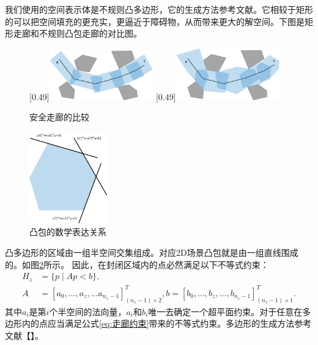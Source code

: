 \documentclass[master,academic]{ysuthesis} %
\begin{document}
		我们使用的空间表示体是不规则凸多边形，它的生成方法参考文献\cite{SikangLiu:2017}。它相较于矩形的可以把空间填充的更充实，更逼近于障碍物，从而带来更大的解空间。下图是矩形走廊和不规则凸包走廊的对比图。
		\begin{figure}[!ht]
			\centering
			[0.49\textwidth]{\includegraphics[width=0.4\textwidth]{安全走廊比较矩形1.png}}
			[0.49\textwidth]{\includegraphics[width=0.4\textwidth]{安全走廊比较多边形2.png}}
			\caption{安全走廊的比较}
			\label{安全走廊比较}
		\end{figure}
		\begin{figure}[!ht]
			\centering
			\includegraphics[width=0.3\textwidth]{凸包矩阵.png}
			\caption{凸包的数学表达关系}
			\label{fig:凸包矩阵}
		\end{figure}
		
		凸多边形的区域由一组半空间交集组成。对应2D场景凸包就是由一组直线围成的。如图\ref{fig:凸包矩阵}所示。
		因此，在封闭区域内的点必然满足以下不等式约束：
		\begin{equation}
			\begin{aligned}
				H_z&=\{p\mid Ap<b\},\\
				A&=\left[ a_0,...,a_z,...a_{n_z-1} \right]^T_{(n_z-1)\times 2},b=\left[ b_0,...,b_z,...,b_{n_z-1} \right]^T_{(n_z-1)\times 1}.
			\end{aligned}
			\label{eq:走廊约束}
		\end{equation}
		其中$a_i$是第$i$个半空间的法向量，$a_i$和$b_i$唯一去确定一个超平面约束。对于任意在多边形内的点应当满足公式\ref{eq:走廊约束}带来的不等式约束。多边形的生成方法参考文献【】。
	
\end{document}
